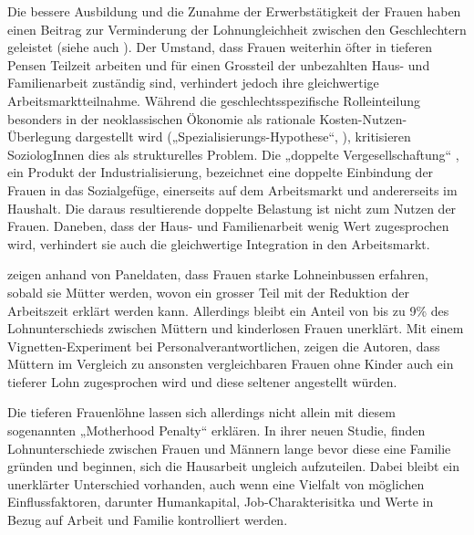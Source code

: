 \documentclass[a4paper,12pt]{article}
\begin{document}
Die bessere Ausbildung und die Zunahme der Erwerbstätigkeit der Frauen haben einen Beitrag
zur Verminderung der Lohnungleichheit zwischen den Geschlechtern geleistet
(siehe auch \citealp{Jann-Engelhardt-2008}). Der Umstand, dass Frauen weiterhin
öfter in tieferen Pensen Teilzeit arbeiten und für einen Grossteil der
unbezahlten Haus- und Familienarbeit zuständig sind, verhindert jedoch ihre
gleichwertige Arbeitsmarktteilnahme. Während die geschlechtsspezifische
Rolleinteilung besonders in der neoklassischen Ökonomie als rationale
Kosten-Nutzen-Überlegung dargestellt wird („Spezialisierungs-Hypothese“,
\citealp{Becker-1981}), kritisieren SoziologInnen dies als strukturelles
Problem. Die „doppelte Vergesellschaftung“ \citep{Becker-Schmidt-2008}, ein
Produkt der Industrialisierung, bezeichnet eine doppelte Einbindung der Frauen
in das Sozialgefüge, einerseits auf dem Arbeitsmarkt und andererseits im
Haushalt. Die daraus resultierende doppelte Belastung ist nicht zum Nutzen der
Frauen. Daneben, dass der Haus- und Familienarbeit wenig Wert zugesprochen
wird, verhindert sie auch die gleichwertige Integration in den Arbeitsmarkt.

\cite{Oesch:2017} zeigen anhand von Paneldaten, dass Frauen starke Lohneinbussen erfahren, sobald sie Mütter werden, wovon ein grosser Teil mit der Reduktion der Arbeitszeit erklärt werden kann. Allerdings bleibt ein Anteil von bis zu 9\% des Lohnunterschieds zwischen Müttern und kinderlosen Frauen unerklärt. Mit einem Vignetten-Experiment bei Personalverantwortlichen, zeigen die Autoren, dass Müttern im Vergleich zu ansonsten vergleichbaren Frauen ohne Kinder auch ein tieferer Lohn zugesprochen wird und diese seltener angestellt würden. 

Die tieferen Frauenlöhne lassen sich allerdings nicht allein mit diesem sogenannten „Motherhood Penalty“  \citep{Budig-2001} erklären. In ihrer neuen Studie, finden \cite{Combet-2019} Lohnunterschiede zwischen Frauen und Männern lange bevor diese eine Familie gründen und beginnen, sich die Hausarbeit ungleich aufzuteilen. Dabei bleibt ein unerklärter Unterschied vorhanden, auch wenn eine Vielfalt von möglichen Einflussfaktoren, darunter Humankapital, Job-Charakterisitka und Werte in Bezug auf Arbeit und Familie kontrolliert werden. 
\end{document}
